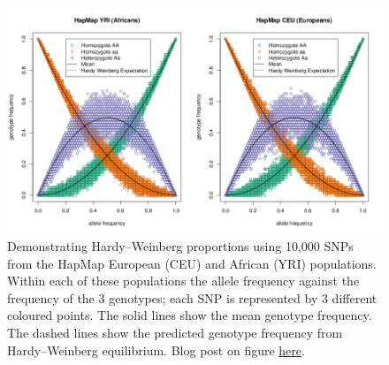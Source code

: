 {{\begin{figure}[!h]
\begin{center}
\includegraphics[width= \textwidth]{figures/CEU_YRI_separately_HWE.png}
\end{center}
\caption{Demonstrating Hardy--Weinberg proportions using 10,000 SNPs
  from the HapMap European (CEU)  and African (YRI) populations. Within
  each of these populations the allele frequency against the
  frequency of the 3 genotypes; each SNP is represented by 3 different
  coloured points. The solid lines show the mean genotype frequency. The dashed lines show the
  predicted genotype frequency from Hardy--Weinberg
  equilibrium.  Blog
  post on figure \href{http://gcbias.org/2011/10/13/population-genetics-course-resources-Hardy--Weinberg-eq/}{here}. } \label{fig:HWE_CEU_YRI}  %
\end{figure}





}}
